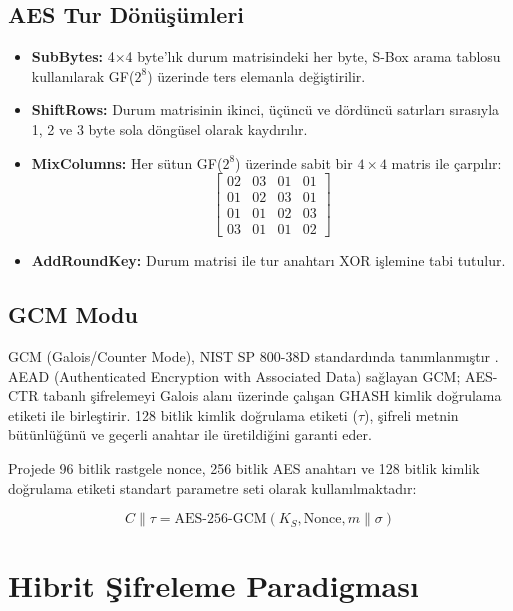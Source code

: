 	\subsection{AES Tur Dönüşümleri}

\begin{itemize}
    \item \textbf{SubBytes:} 4×4 byte'lık durum matrisindeki her byte, S-Box arama tablosu kullanılarak GF($2^8$) üzerinde ters elemanla değiştirilir.
    \item \textbf{ShiftRows:} Durum matrisinin ikinci, üçüncü ve dördüncü satırları sırasıyla 1, 2 ve 3 byte sola döngüsel olarak kaydırılır.
    \item \textbf{MixColumns:} Her sütun GF($2^8$) üzerinde sabit bir $4 \times 4$ matris ile çarpılır:
        \begin{equation}
            \begin{bmatrix} 02 & 03 & 01 & 01 \\ 01 & 02 & 03 & 01 \\ 01 & 01 & 02 & 03 \\ 03 & 01 & 01 & 02 \end{bmatrix}
        \end{equation}
    \item \textbf{AddRoundKey:} Durum matrisi ile tur anahtarı XOR işlemine tabi tutulur.
\end{itemize}

	\subsection{GCM Modu}

GCM (Galois/Counter Mode), NIST SP 800-38D standardında tanımlanmıştır \cite{SP80038D}. AEAD (Authenticated Encryption with Associated Data) sağlayan GCM; AES-CTR tabanlı şifrelemeyi Galois alanı üzerinde çalışan GHASH kimlik doğrulama etiketi ile birleştirir. 128 bitlik kimlik doğrulama etiketi ($\tau$), şifreli metnin bütünlüğünü ve geçerli anahtar ile üretildiğini garanti eder.

Projede 96 bitlik rastgele nonce, 256 bitlik AES anahtarı ve 128 bitlik kimlik doğrulama etiketi standart parametre seti olarak kullanılmaktadır:

\begin{equation}
    C \| \tau = \text{AES-256-GCM}(K_S, \text{Nonce}, m \| \sigma)
\end{equation}

	\section{Hibrit Şifreleme Paradigması}

